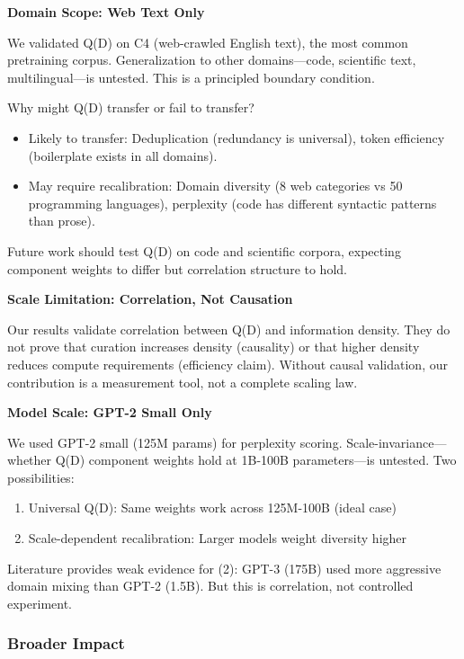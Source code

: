 \textbf{Domain Scope: Web Text Only}

We validated Q(D) on C4 (web-crawled English text), the most common pretraining corpus. Generalization to other domains---code, scientific text, multilingual---is untested. This is a principled boundary condition.

Why might Q(D) transfer or fail to transfer?

\begin{itemize}
\item Likely to transfer: Deduplication (redundancy is universal), token efficiency (boilerplate exists in all domains).
\item May require recalibration: Domain diversity (8 web categories vs 50 programming languages), perplexity (code has different syntactic patterns than prose).
\end{itemize}

Future work should test Q(D) on code and scientific corpora, expecting component weights to differ but correlation structure to hold.

\textbf{Scale Limitation: Correlation, Not Causation}

Our results validate correlation between Q(D) and information density. They do not prove that curation increases density (causality) or that higher density reduces compute requirements (efficiency claim). Without causal validation, our contribution is a measurement tool, not a complete scaling law.

\textbf{Model Scale: GPT-2 Small Only}

We used GPT-2 small (125M params) for perplexity scoring. Scale-invariance---whether Q(D) component weights hold at 1B-100B parameters---is untested. Two possibilities:

\begin{enumerate}
\item Universal Q(D): Same weights work across 125M-100B (ideal case)
\item Scale-dependent recalibration: Larger models weight diversity higher
\end{enumerate}

Literature provides weak evidence for (2): GPT-3 (175B) used more aggressive domain mixing than GPT-2 (1.5B). But this is correlation, not controlled experiment.

\subsubsection{Broader Impact}

